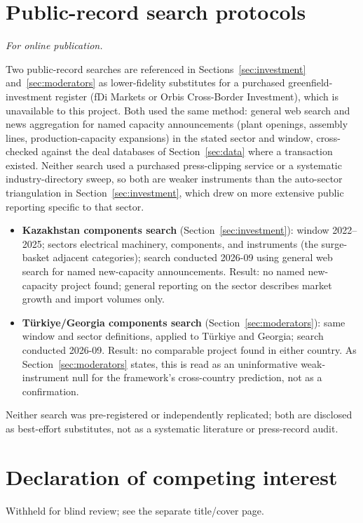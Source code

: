 \documentclass[12pt]{article}
\begin{document}
\section{Public-record search protocols}\label{app:search}
\emph{For online publication.}

\medskip
Two public-record searches are referenced in Sections~\ref{sec:investment}
and~\ref{sec:moderators} as lower-fidelity substitutes for a purchased greenfield-investment
register (fDi Markets or Orbis Cross-Border Investment), which is unavailable to this project.
Both used the same method: general web search and news aggregation for named capacity
announcements (plant openings, assembly lines, production-capacity expansions) in the stated
sector and window, cross-checked against the deal databases of Section~\ref{sec:data} where a
transaction existed. Neither search used a purchased press-clipping service or a systematic
industry-directory sweep, so both are weaker instruments than the auto-sector triangulation
in Section~\ref{sec:investment}, which drew on more extensive public reporting specific to
that sector.

\begin{itemize}
\item \textbf{Kazakhstan components search} (Section~\ref{sec:investment}): window
2022--2025; sectors electrical machinery, components, and instruments (the surge-basket
adjacent categories); search conducted 2026-09 using general web search for named
new-capacity announcements. Result: no named new-capacity project found; general reporting on
the sector describes market growth and import volumes only.
\item \textbf{T\"urkiye/Georgia components search} (Section~\ref{sec:moderators}): same
window and sector definitions, applied to T\"urkiye and Georgia; search conducted 2026-09.
Result: no comparable project found in either country. As Section~\ref{sec:moderators}
states, this is read as an uninformative weak-instrument null for the framework's
cross-country prediction, not as a confirmation.
\end{itemize}

Neither search was pre-registered or independently replicated; both are disclosed as
best-effort substitutes, not as a systematic literature or press-record audit.

\section*{Declaration of competing interest}
Withheld for blind review; see the separate title/cover page.
\end{document}
